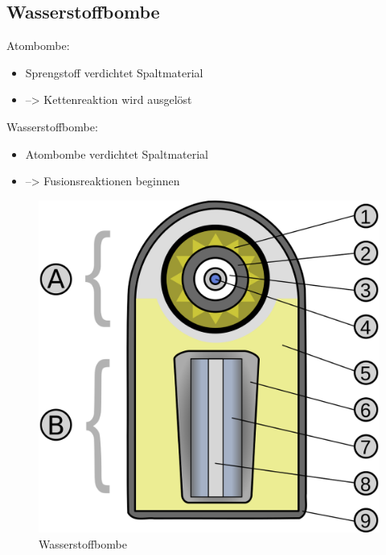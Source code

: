 \documentclass[10pt,a4paper, ngerman]{beamer}
\begin{document}
\subsection{Wasserstoffbombe}
\begin{frame}{\subsecname}{\secname}
\LARGE Atombombe: \normalsize
\begin{itemize}
\item Sprengstoff verdichtet Spaltmaterial
\item --> Kettenreaktion wird ausgelöst 
\end{itemize}
\pause
\vspace{1cm}
\LARGE Wasserstoffbombe: \normalsize
\begin{itemize}
\item Atombombe verdichtet Spaltmaterial
\item --> Fusionsreaktionen beginnen
\end{itemize}
\end{frame}

\begin{frame}{\subsecname}{\secname}
\begin{figure}
\centering
\includegraphics[height=0.8\textheight]{h-bomb}
\caption{Wasserstoffbombe}
\label{fig:h-bomb}
\end{figure}
\end{frame}
\end{document}
